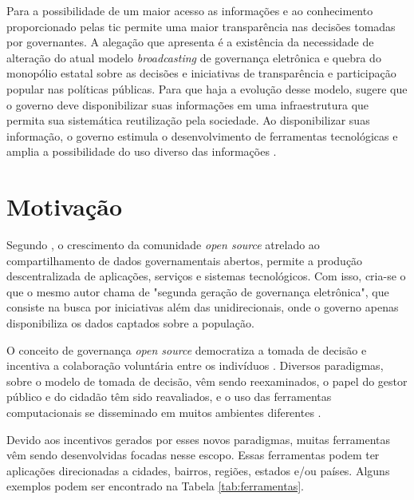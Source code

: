 \vspace{0.3CM}
\par
Para  a possibilidade de um maior acesso as informações e ao conhecimento proporcionado pelas \acrshort{tic}
permite uma maior transparência nas decisões tomadas por governantes. A alegação que  apresenta é a existência da necessidade de alteração do atual modelo
\textit{broadcasting} de governança eletrônica e quebra do monopólio estatal sobre as decisões e iniciativas de transparência e participação popular nas políticas públicas.
Para que haja a evolução desse modelo,  sugere que o governo deve disponibilizar suas informações em uma infraestrutura que permita sua sistemática reutilização
pela sociedade. Ao disponibilizar suas informação, o governo estimula o desenvolvimento de ferramentas tecnológicas e amplia a possibilidade 
do uso diverso das informações \cite{zuiderwijk2012socio}.

\section{Motivação}
\label{sec:motivacao}
Segundo , o crescimento da comunidade \textit{open source} atrelado ao compartilhamento de dados governamentais abertos, permite a produção
descentralizada de aplicações, serviços e sistemas tecnológicos. Com isso, cria-se o que o mesmo autor chama de "segunda geração de governança eletrônica", que consiste na busca
por iniciativas além das unidirecionais, onde o governo apenas disponibiliza os dados captados sobre a população.

\par
O conceito de governança \textit{open source} democratiza a tomada de decisão e incentiva a colaboração voluntária entre os indivíduos \cite{rushkoff2003open}.
Diversos paradigmas, sobre o modelo de tomada de decisão, vêm sendo reexaminados, o papel do gestor público e do cidadão têm sido reavaliados,
e o uso das ferramentas computacionais se disseminado em muitos ambientes diferentes \cite{medeiros2009novos}.

\par
Devido aos incentivos gerados por esses novos paradigmas, muitas ferramentas vêm sendo desenvolvidas focadas nesse escopo.
Essas ferramentas podem ter aplicações direcionadas a cidades, bairros, regiões, estados e/ou países.  
Alguns exemplos podem ser encontrado na Tabela \ref{tab:ferramentas}.

